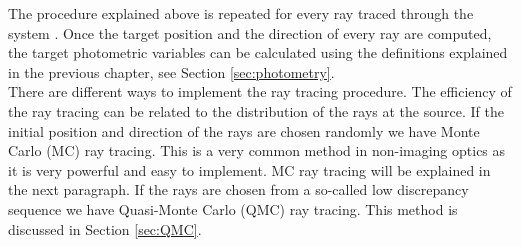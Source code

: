 The procedure explained above is repeated for every ray traced through the system \cite{Gross2005Handbook}. 
Once the target position and the direction of every ray are computed, the target photometric variables can be calculated using the definitions explained in the previous chapter, see Section \ref{sec:photometry}.
\\ \indent
There are different ways to implement the ray tracing procedure. The efficiency of the ray tracing can be related to the distribution of the rays at the source. 
If the initial position and direction of the rays are chosen randomly we have Monte Carlo (MC) ray tracing. 
This is a very common method in non-imaging optics as it is very powerful and easy to implement. MC ray tracing will be explained in the next paragraph.
If the rays are chosen from a so-called low discrepancy sequence we have Quasi-Monte Carlo (QMC) ray tracing.
This method is discussed in Section \ref{sec:QMC}.
